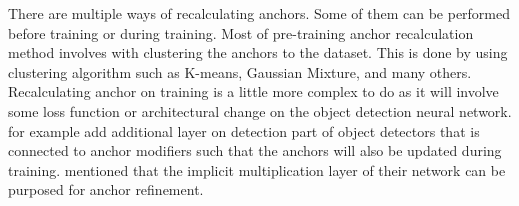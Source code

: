   There are multiple ways of recalculating anchors. Some of them can be performed before training or during training.
  Most of pre-training anchor recalculation method involves with clustering the anchors to the dataset. This is done by
  using clustering algorithm such as K-means, Gaussian Mixture, and many others. Recalculating anchor on training is 
  a little more complex to do as it will involve some loss function or architectural change on the object detection neural network.
  \textcite{anchoropt} for example add additional layer on detection part of object detectors that is connected to anchor modifiers such that
  the anchors will also be updated during training. \textcite{yolor} mentioned that the implicit multiplication layer of their network
  can be purposed for anchor refinement.



